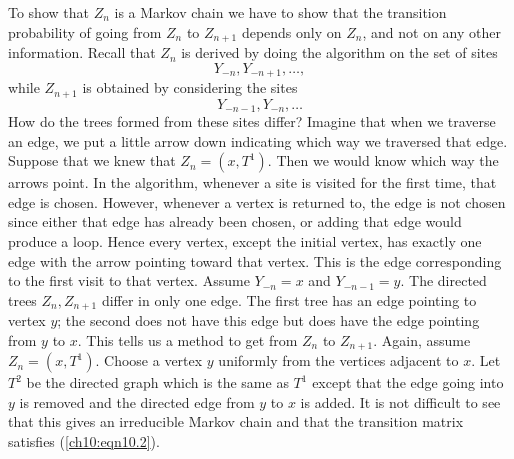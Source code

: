 \documentclass{stml-l}
\theoremstyle{definition}
\numberwithin{equation}{chapter}
\numberwithin{figure}{chapter}
\numberwithin{figure}{section}
\begin{document}
To show that $Z_{n}$ is a Markov chain we have to show that the
transition probability of going from $Z_{n}$ to $Z_{n+1}$ depends
only on $Z_{n}$, and not on any other information. Recall that
$Z_{n}$ is derived by doing the algorithm on the set of sites
\begin{equation}
\label{ch10:eqn10.3}Y_{-n},Y_{-n+1},\ldots,
\end{equation}
while $Z_{n+1}$ is obtained by considering the sites
\begin{equation}
\label{ch10:eqn10.4}Y_{-n-1},Y_{-n},\ldots
\end{equation}
How do the trees formed from these sites differ? Imagine that when
we traverse an edge, we put a little arrow down indicating which way
we traversed that edge. Suppose that we knew that $Z_{n}=(x,T^{1})$.
 Then we would know which way the arrows point. In the algorithm,
whenever a site is visited for the first time, that edge is chosen.
However, whenever a vertex is returned to, the edge is not chosen
since either that edge has already been chosen, or adding that edge
would produce a loop. Hence every vertex, except the initial vertex,
has exactly one edge with the arrow pointing toward that vertex.
This is the edge corresponding to the first visit to that vertex.
Assume $Y_{-n}=x$ and $Y_{-n-1}=y$. The directed trees
$Z_{n},Z_{n+1}$ differ in only one edge. The first tree has an edge
pointing to vertex $y$; the second does not have this edge but does
have the edge pointing from $y$ to $x$. This tells us a method to
get from $Z_{n}$ to $Z_{n+1}$. Again, assume $Z_{n}=(x,T^{1})$.
Choose a vertex $y$ uniformly from the vertices adjacent to $x$. Let
$T^{2}$ be the directed graph which is the same as $T^{1}$ except
that the edge going into $y$ is removed and the directed edge from
$y$ to $x$ is added. It is not difficult to see that this gives an
irreducible Markov chain and that the transition matrix satisfies
(\ref{ch10:eqn10.2}).
\end{document}
